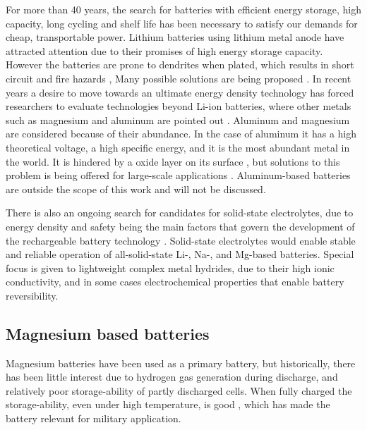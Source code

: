 For more than 40 years, the search for batteries with efficient energy storage, high capacity, long cycling and shelf life has been necessary to satisfy our demands for cheap, transportable power. Lithium batteries using lithium metal anode have attracted attention due to their promises of high energy storage capacity. However the batteries are prone to dendrites when plated, which results in short circuit and fire hazards \cite{xu2004nonaqueous}\cite{kim2013metallic}, Many possible solutions are being proposed \cite{liu2016lithium} \cite{zhang2015ex} \cite{li2018self} \cite{lee2017suppressing}. In recent years a desire to move towards an ultimate energy density technology has forced researchers to evaluate technologies beyond Li-ion batteries, where other metals such as magnesium and aluminum are pointed out \cite{reddy2011linden} \cite{yoo2013mg}. Aluminum and magnesium are considered because of their abundance. In the case of aluminum it has a high theoretical voltage, a high specific energy, and it is the most abundant metal in the world. It is hindered by a oxide layer on its surface \cite{li2002aluminum}, but solutions to this problem is being offered for large-scale applications \cite{van2014rechargeable}. Aluminum-based batteries are outside the scope of this work and will not be discussed.


There is also an ongoing search for candidates for solid-state electrolytes, due to energy density and safety being the main factors that govern the development of the rechargeable battery technology \cite{guzik2019lightweight}. Solid-state electrolytes would enable stable and reliable operation of all-solid-state Li-, Na-, and Mg-based batteries. Special focus is given to lightweight complex metal hydrides, due to their high ionic conductivity, and in some cases electrochemical properties that enable battery reversibility. 


\subsection{Magnesium based batteries}
	
	Magnesium batteries have been used as a primary battery, but historically, there has been little interest due to hydrogen gas generation during discharge, and relatively poor storage-ability of partly discharged cells. When fully charged the storage-ability, even under high temperature, is good \cite{reddy2011linden}, which has made the battery relevant for military application. 

